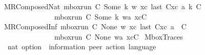 \begin{isabellebody}
\ \ MRComposedNat{\isacharcolon}{\kern0pt}\ {\isachardoublequoteopen}{\isasymlbrakk}mbox{\isacharunderscore}{\kern0pt}run\ C{}\ {\isacharparenleft}{\kern0pt}Some\ k{\isacharparenright}{\kern0pt}\ w\ xc{\isacharsemicolon}{\kern0pt}\ last\ {\isacharparenleft}{\kern0pt}C{}{\isacharhash}{\kern0pt}xc{\isacharparenright}{\kern0pt}\ {\isasymmidarrow}{\isasymlangle}a{\isacharcomma}{\kern0pt}\ k{\isasymrangle}{\isasymrightarrow}\ C{\isasymrbrakk}\ {\isasymLongrightarrow}\isanewline
\ \ \ \ \ \ \ \ \ \ \ \ \ \ \ \ mbox{\isacharunderscore}{\kern0pt}run\ C{}\ {\isacharparenleft}{\kern0pt}Some\ k{\isacharparenright}{\kern0pt}\ {\isacharparenleft}{\kern0pt}w{\isasymsqdot}{\isacharbrackleft}{\kern0pt}a{\isacharbrackright}{\kern0pt}{\isacharparenright}{\kern0pt}\ {\isacharparenleft}{\kern0pt}xc{\isacharat}{\kern0pt}{\isacharbrackleft}{\kern0pt}C{\isacharbrackright}{\kern0pt}{\isacharparenright}{\kern0pt}{\isachardoublequoteclose}\ {\isacharbar}{\kern0pt}\isanewline
\ \ MRComposedInf{\isacharcolon}{\kern0pt}\ {\isachardoublequoteopen}{\isasymlbrakk}mbox{\isacharunderscore}{\kern0pt}run\ C{}\ None\ w\ xc{\isacharsemicolon}{\kern0pt}\ last\ {\isacharparenleft}{\kern0pt}C{}{\isacharhash}{\kern0pt}xc{\isacharparenright}{\kern0pt}\ {\isasymmidarrow}{\isasymlangle}a{\isacharcomma}{\kern0pt}\ {\isasyminfinity}{\isasymrangle}{\isasymrightarrow}\ C{\isasymrbrakk}\ {\isasymLongrightarrow}\isanewline
\ \ \ \ \ \ \ \ \ \ \ \ \ \ \ \ mbox{\isacharunderscore}{\kern0pt}run\ C{}\ None\ {\isacharparenleft}{\kern0pt}w{\isasymsqdot}{\isacharbrackleft}{\kern0pt}a{\isacharbrackright}{\kern0pt}{\isacharparenright}{\kern0pt}\ {\isacharparenleft}{\kern0pt}xc{\isacharat}{\kern0pt}{\isacharbrackleft}{\kern0pt}C{\isacharbrackright}{\kern0pt}{\isacharparenright}{\kern0pt}{\isachardoublequoteclose}%
\isadelimdocument
%
\endisadelimdocument
%
\isatagdocument
%
\isamarkuptrue%
%
\endisatagdocument
{\isafolddocument}%
%
\isadelimdocument
%
\endisadelimdocument
{}\isamarkupfalse%
\ MboxTraces\isanewline
\ \ {\isacharcolon}{\kern0pt}{\isacharcolon}{\kern0pt}\ {\isachardoublequoteopen}nat\ option\ {\isasymRightarrow}\ {\isacharparenleft}{\kern0pt}{\isacharprime}{\kern0pt}information{\isacharcomma}{\kern0pt}\ {\isacharprime}{\kern0pt}peer{\isacharparenright}{\kern0pt}\ action\ language{\isachardoublequoteclose}\ \ {\isacharparenleft}{\kern0pt}{\isachardoublequoteopen}{\isasymT}\isactrlbsub {\isacharunderscore}{\kern0pt}\isactrlesub {\isachardoublequoteclose}\ {\isacharbrackleft}{\kern0pt}{}{}{}{\isacharbrackright}{\kern0pt}\ {}{}{}{\isacharparenright}{\kern0pt}\isanewline

\end{isabellebody}
